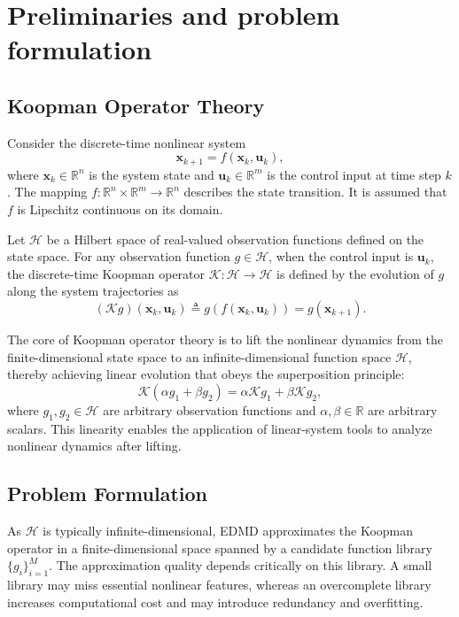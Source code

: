 \documentclass[letterpaper,10pt,conference]{ieeeconf}
\newcommand{\R}{\mathbb{R}}
\newcommand{\x}{\mathbf{x}}
\newcommand{\uvec}{\mathbf{u}}
\begin{document}
\section{Preliminaries and problem formulation}
\label{sec:background}

\subsection{Koopman Operator Theory}
\label{subsec:koopman_theory}

Consider the discrete-time nonlinear system
\begin{equation}
\x_{k+1} = f(\x_k, \uvec_k),
\end{equation}
where $\x_k \in \R^n$ is the system state and $\uvec_k \in \R^m$ is the control input at time step $k$. The mapping $f: \R^n \times \R^m \to \R^n$ describes the state transition. It is assumed that $f$ is Lipschitz continuous on its domain.

Let \(\mathcal{H}\) be a Hilbert space of real-valued observation functions defined on the state space. For any observation function \(g \in \mathcal{H}\), when the control input is \(\uvec_k\), the discrete-time Koopman operator \(\mathcal{K}: \mathcal{H} \to \mathcal{H}\) is defined by the evolution of \(g\) along the system trajectories as
\begin{equation}
(\mathcal{K}g)(\x_k,\uvec_k) \triangleq g(f(\x_k,\uvec_k)) = g(\x_{k+1}).
\end{equation}

The core of Koopman operator theory is to lift the nonlinear dynamics
from the finite-dimensional state space to an infinite-dimensional
function space $\mathcal{H}$, thereby achieving linear evolution that
obeys the superposition principle:
\begin{equation}
\mathcal{K}(\alpha g_1 + \beta g_2) = \alpha \mathcal{K}g_1 + \beta \mathcal{K}g_2,
\end{equation}
where $g_1, g_2 \in \mathcal{H}$ are arbitrary observation functions and $\alpha, \beta \in \mathbb{R}$ are arbitrary
scalars. This linearity enables the application of linear-system tools to analyze
nonlinear dynamics after lifting.

\subsection{Problem Formulation}
\label{subsec:motivation}
As $\mathcal{H}$ is typically infinite-dimensional, EDMD approximates the Koopman operator in a finite-dimensional space spanned by a candidate function library $\{g_i\}_{i=1}^M$. The approximation quality depends critically on this library. A small library may miss essential nonlinear features, whereas an overcomplete library increases computational cost and may introduce redundancy and overfitting.
\end{document}
